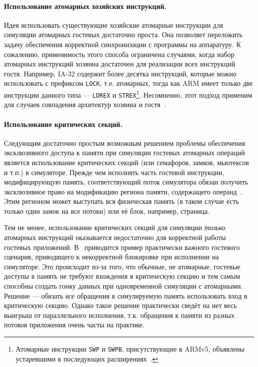 \paragraph{Использование атомарных хозяйских инструкций.} Идея использовать существующие хозяйские атомарные инструкции для симуляции атомарных гостевых достаточно проста. Она позволяет переложить задачу обеспечения корректной синхронизации с программы на аппаратуру. К сожалению, применимость этого способа ограничена случаями, когда набор атомарных инструкций хозяина достаточен для реализации всех инструкций гостя. Например, IA-32 содержит более десятка инструкций, которые можно использовать с префиксом \texttt{LOCK}, т.е. атомарных, тогда как ARM имеет только две инструкции данного типа --- \texttt{LDREX} и \texttt{STREX}\footnote{Атомарные инструкции \texttt{SWP} и \texttt{SWPB}, присутствующие в ARMv5, объявлены устаревшими в последующих расширениях~\cite{arm-atomics}.}. Несомненно, этот подход применим для случаев совпадения архитектур хозяина и гостя~\cite{lantz-thesis}.

\paragraph{Использование критических секций.} Следующим достаточно простым возможным решением проблемы обеспечения эксклюзивного доступа к памяти при симуляции гостевых атомарных операций является использование критических секций (или семафоров, замков, мьютексов и т.п.) в симуляторе. Прежде чем исполнять часть гостевой инструкции, модифицирующую память, соответствующий поток симулятора обязан получить эксклюзивное право на модификацию региона памяти, содержащего операнд~\cite{pqemu2001}. Этим регионом может выступать вся физическая память (в таком случае есть только один замок на все потоки) или её блок, например, страница.

Тем не менее, использование критических секций для симуляции \emph{только} атомарных инструкций оказывается недостаточно для корректной работы гостевых приложений. В~\cite{coremu} приводится пример практически важного гостевого сценария, приводящего к некорректной блокировке при исполнении на симуляторе. Это происходит из-за того, что обычные, не атомарные, гостевые доступы в память не требуют вхождения в критическую секцию и тем самым способны создать гонку данных при одновременной симуляции с атомарными. Решение --- обязать \emph{все} обращения в симулируемую память использовать вход в критическую секцию. Однако такое решение практически сведёт на нет весь выигрыш от параллельного исполнения, т.к. обращения к памяти из разных потоков приложения очень часты на практике.

